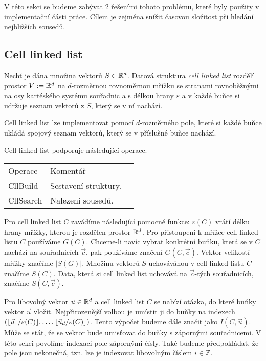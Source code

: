 V této sekci se budeme zabývat 2 řešeními tohoto problému, které byly použity v implementační části práce. Cílem je zejména snížit časovou složitost při hledání nejbližších sousedů.

\subsection{Cell linked list}

\label{defi:cll}
\begin{defi}
  Nechť je dána množina vektorů $S \in \mathbb{R}^d$. Datová struktura \textit{cell linked list} rozdělí prostor $V := \mathbb{R}^d$ na $d$-rozměrnou rovnoměrnou mřížku se stranami rovnoběžnými na osy kartéského systému souřadnic a s délkou hrany $\varepsilon$ a v každé buňce si udržuje seznam vektorů z $S$, který se v ní nachází.\cite[s.~149--152]{computer_simulation_of_liquids}
\end{defi}

Cell linked list lze implementovat pomocí $d$-rozměrného pole, které si každé buňce ukládá spojový seznam vektorů, který se v příslušné buňce nachází.

\noindent Cell linked list podporuje následující operace.

\begin{table}[ht!]
  \begin{tabular}{lll}
    Operace & Komentář\\
    CllBuild & Sestavení struktury.\\
    CllSearch & Nalezení sousedů.\\
  \end{tabular}
\end{table}

Pro cell linked list $C$ zavádíme následující pomocné funkce: $\varepsilon(C)$ vrátí délku hrany mřížky, kterou je rozdělen prostor $\mathbb{R}^d$. Pro přistoupení k mřížce cell linked listu $C$ používáme $G(C)$. Chceme-li navíc vybrat konkrétní buňku, která se v $C$ nachází na souřadnicích $\vec{c}$, pak používáme značení $G(C, \vec{c})$. Vektor velikostí mřížky značíme $|S(G)|$. Množinu vektorů $S$ uchovávánou v cell linked listu $C$ značíme $S(C)$. Data, která si cell linked list uchovává na $\vec{c}$-tých souřadnicích, značíme $S(C, \vec{c})$.

Pro libovolný vektor $\vec{u} \in \mathbb{R}^d$ a cell linked list $C$ se nabízí otázka, do které buňky vektor $\vec{u}$ vložit. Nejpřirozenější volbou je umístit ji do buňky na indexech $(\lfloor\vec{u}_1/\varepsilon(C)\rfloor, \ldots, \lfloor\vec{u}_d/\varepsilon(C)\rfloor)$. Tento výpočet budeme dále značit jako $I(C, \vec{u})$. Může se stát, že se vektor bude umisťovat do buňky s zápornými souřadnicemi. V této sekci povolíme indexaci pole zápornými čísly. Také budeme předpokládat, že pole jsou nekonečná, tzn. lze je indexovat libovolným číslem $i \in \mathbb{Z}$.

